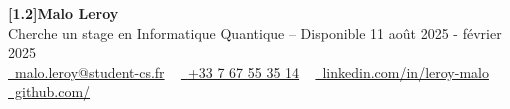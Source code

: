 \begin{center}
    {\Huge\bfseries\sffamily \scalebox{1.0}[1.2]{Malo Leroy}}
    \\ Cherche un stage en Informatique Quantique -- Disponible 11 août 2025 - février 2025 \\
    \small
    \href{mailto:malo.leroy@student-cs.fr}{\raisebox{-0.2\height}\faEnvelope\  malo.leroy@student-cs.fr} ~
    \href{tel:+33767553514}{\raisebox{-0.2\height}\faPhone\  {+33 7 67 55 35 14}} ~
    \href{https://linkedin.com/in/leroy-malo}{\raisebox{-0.2\height}\faLinkedin\ linkedin.com/in/leroy-malo}  ~
    \href{https://github.com/\ghusername}{\raisebox{-0.2\height}\faGithub\ github.com/\ghusername}
\end{center}
